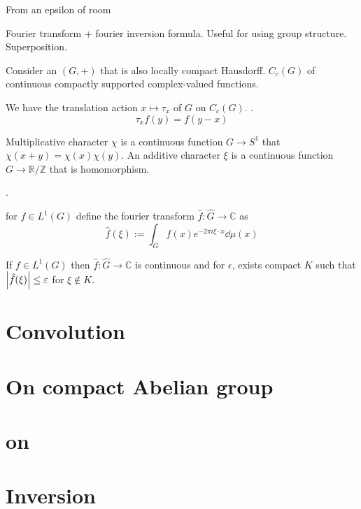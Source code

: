 From an epsilon of room

Fourier transform + fourier inversion formula. Useful for using group structure. Superposition. 

Consider an  \((G, +)\) that is also locally compact Hausdorff. \(C_{c}(G)\) of continuous compactly supported complex-valued functions. 

We have the translation action \(x \mapsto \tau_{x}\) of \(G\) on \(C_{c}(G)\). . 
\begin{equation*}
    \tau_{x} f(y) = f(y-x)
\end{equation*}

\begin{defn}[Characters]
    Multiplicative character \(\chi\) is a continuous function \(G\to S^{1}\) that \(\chi(x+y) = \chi(x)\chi(y) \). An additive character \(\xi\) is a continuous function \(G \to \mathbb{R}/\mathbb{Z}\) that is homomorphism. 
\end{defn}

. 

\begin{defn}
    for \(f \in L^{1}(G)\) define the fourier transform 
    \(\hat{f} : \hat{G} \to \mathbb{C}\) as 
    \begin{equation*}
        \hat{f}(\xi) := \int_{G} f(x) e^{-2\pi i \xi\cdot x} \dd{\mu(x)}
    \end{equation*}
\end{defn}

\begin{thm}
    If \(f \in L^{1}(G)\) then \(\hat{f} : \hat{G} \to \mathbb{C}\) is continuous and for \(\epsilon\), exists  compact \(K\) such that \(\abs{\hat{f}\pqty{\xi} } \leq \epsilon\) for \(\xi \notin K\).  
\end{thm}

\section{Convolution}
\section{On compact Abelian group}

\section{on }

\section{Inversion}
